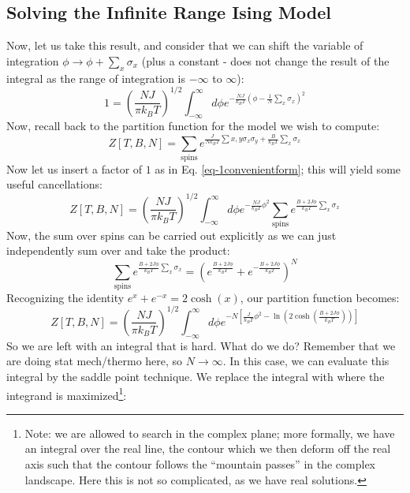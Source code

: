 \subsection{Solving the Infinite Range Ising Model}
Now, let us take this result, and consider that we can shift the variable of integration $\phi \to \phi + \sum_x \sigma_x$ (plus a constant - does not change the result of the integral as the range of integration is $-\infty$ to $\infty$):
\begin{equation}\label{eq-1convenientform}
    1 = \left(\frac{NJ}{\pi k_B T}\right)^{1/2}\int_{-\infty}^\infty d\phi e^{-\frac{NJ}{k_B T}\left(\phi - \frac{1}{N}\sum_x \sigma_x\right)^2}
\end{equation}
Now, recall back to the partition function for the model we wish to compute:
\begin{equation}
    Z[T, B, N] = \sum_{\text{spins}} e^{\frac{J}{Nk_B T}\sum{x, y}\sigma_x\sigma_y + \frac{B}{k_B T}\sum_x \sigma_x}
\end{equation}
Now let us insert a factor of $1$ as in Eq. \eqref{eq-1convenientform}; this will yield some useful cancellations:
\begin{equation}
    Z[T, B, N] = \left(\frac{NJ}{\pi k_B T}\right)^{1/2}\int_{-\infty}^\infty d\phi e^{-\frac{NJ}{k_B T}\phi^2}\sum_{\text{spins}} e^{\frac{B + 2J\phi}{k_B T}\sum_x\sigma_x}
\end{equation}
Now, the sum over spins can be carried out explicitly as we can just independently sum over and take the product:
\begin{equation}
    \sum_{\text{spins}} e^{\frac{B + 2J\phi}{k_B T}\sum_x\sigma_x} = \left(e^{\frac{B + 2J\phi}{k_B T}} + e^{-\frac{B + 2J\phi}{k_B T}}\right)^N
\end{equation}
Recognizing the identity $e^{x} + e^{-x} = 2\cosh(x)$, our partition function becomes:
\begin{equation}
    Z[T, B, N] = \left(\frac{NJ}{\pi k_B T}\right)^{1/2} \int_{-\infty}^\infty d\phi e^{-N\left[\frac{J}{k_B T}\phi^2 - \ln(2\cosh(\frac{B + 2J\phi}{k_B T}))\right]}
\end{equation}
So we are left with an integral that is hard. What do we do? Remember that we are doing stat mech/thermo here, so $N \to \infty$. In this case, we can evaluate this integral by the saddle point technique. We replace the integral with where the integrand is maximized\footnote{Note: we are allowed to search in the complex plane; more formally, we have an integral over the real line, the contour which we then deform off the real axis such that the contour follows the ``mountain passes'' in the complex landscape. Here this is not so complicated, as we have real solutions.}:
